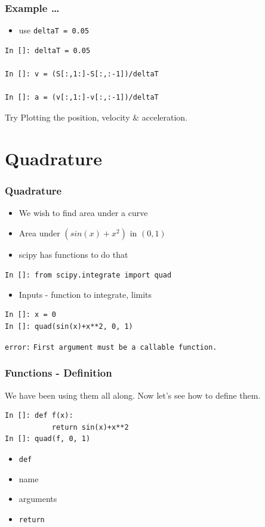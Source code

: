 \documentclass[14pt,compress]{beamer}
\newcommand{\typ}[1]{\lstinline{#1}}
\begin{document}
\begin{frame}[fragile]
\frametitle{Example \ldots}
\begin{itemize}
\item use \typ{deltaT = 0.05}
\end{itemize}
\begin{lstlisting}
In []: deltaT = 0.05

In []: v = (S[:,1:]-S[:,:-1])/deltaT

In []: a = (v[:,1:]-v[:,:-1])/deltaT
\end{lstlisting}
Try Plotting the position, velocity \& acceleration.
\end{frame}

\section{Quadrature}

\begin{frame}[fragile]
\frametitle{Quadrature}
\begin{itemize}
\item We wish to find area under a curve
\item Area under $(sin(x) + x^2)$ in $(0,1)$
\item scipy has functions to do that
\end{itemize}
\begin{small}
  \typ{In []: from scipy.integrate import quad}
\end{small}
\begin{itemize}
\item Inputs - function to integrate, limits
\end{itemize}
\begin{lstlisting}
In []: x = 0
In []: quad(sin(x)+x**2, 0, 1)
\end{lstlisting}
\begin{small}
\alert{\typ{error:}}
\typ{First argument must be a callable function.}
\end{small}
\end{frame}

\begin{frame}[fragile]
\frametitle{Functions - Definition}
We have been using them all along. Now let's see how to define them.
\begin{lstlisting}
In []: def f(x):
           return sin(x)+x**2
In []: quad(f, 0, 1)
\end{lstlisting}
\begin{itemize}
\item \typ{def}
\item name
\item arguments
\item \typ{return}
\end{itemize}
\end{frame}
\end{document}
